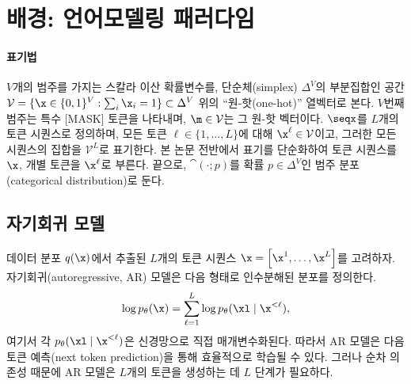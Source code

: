 \documentclass{article} %
\begin{document}

\section{배경: 언어모델링 패러다임}\label{sec:background}
\paragraph{표기법}
$V$개의 범주를 가지는 스칼라 이산 확률변수를, 단순체(simplex) $\Delta^V$의 부분집합인 공간 $\mathcal{V} = \{\x \in \{0, 1\}^{V} : \sum_i \x_i = 1\}\subset \Delta^V$ 위의 ``원-핫(one-hot)'' 열벡터로 본다. $V$번째 범주는 특수 [MASK] 토큰을 나타내며, $\m \in \mathcal{V}$는 그 원-핫 벡터이다.
$\seqx$를 $L$개의 토큰 시퀀스로 정의하며, 모든 토큰 $\ell \in \{1, \ldots, L\}$에 대해 $\x^\ell \in \mathcal{V}$이고, 그러한 모든 시퀀스의 집합을 $\mathcal{V}^L$로 표기한다. 본 논문 전반에서 표기를 단순화하여 토큰 시퀀스를 $\x$, 개별 토큰을 $\x^\ell$로 부른다. 끝으로, $\cat(\cdot; p)$를 확률 $p \in \Delta^V$인 범주 분포(categorical distribution)로 둔다.
\subsection{자기회귀 모델}
데이터 분포 $q(\x)$에서 추출된 $L$개의 토큰 시퀀스 $\x = \left[ \x^1, \dots, \x^L \right]$를 고려하자.
자기회귀(autoregressive, AR) 모델은 다음 형태로 인수분해된 분포를 정의한다.
\begin{align}\label{eq:ar-nll}
    \log p_\theta(\x) = \sum_{\ell=1}^L \log p_\theta(\xl \mid \x^{<\ell}),
\end{align}
여기서 각 $p_\theta(\xl \mid \x^{<\ell})$은 신경망으로 직접 매개변수화된다.
따라서 AR 모델은 다음 토큰 예측(next token prediction)을 통해 효율적으로 학습될 수 있다. 그러나 순차 의존성 때문에 AR 모델은 $L$개의 토큰을 생성하는 데 $L$ 단계가 필요하다.
\end{document}
